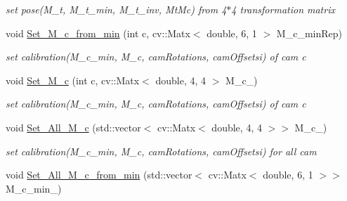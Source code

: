 \begin{DoxyCompactItemize}
\begin{DoxyCompactList}\small\item\em set pose(\+M\+\_\+t, M\+\_\+t\+\_\+min, M\+\_\+t\+\_\+inv, Mt\+Mc) from 4$\ast$4 transformation matrix \end{DoxyCompactList}\item 
void \hyperlink{classMultiColSLAM_1_1cMultiCamSys___a989b4a52f4e372d2620ced94fc675b02}{Set\+\_\+\+M\+\_\+c\+\_\+from\+\_\+min} (int c, cv\+::\+Matx$<$ double, 6, 1 $>$ M\+\_\+c\+\_\+min\+Rep)\hypertarget{classMultiColSLAM_1_1cMultiCamSys___a989b4a52f4e372d2620ced94fc675b02}{}\label{classMultiColSLAM_1_1cMultiCamSys___a989b4a52f4e372d2620ced94fc675b02}

\begin{DoxyCompactList}\small\item\em set calibration(\+M\+\_\+c\+\_\+min, M\+\_\+c, cam\+Rotations, cam\+Offsetsi) of cam c \end{DoxyCompactList}\item 
void \hyperlink{classMultiColSLAM_1_1cMultiCamSys___a39483546d528acc5acdbe500cbf9d23c}{Set\+\_\+\+M\+\_\+c} (int c, cv\+::\+Matx$<$ double, 4, 4 $>$ M\+\_\+c\+\_\+)\hypertarget{classMultiColSLAM_1_1cMultiCamSys___a39483546d528acc5acdbe500cbf9d23c}{}\label{classMultiColSLAM_1_1cMultiCamSys___a39483546d528acc5acdbe500cbf9d23c}

\begin{DoxyCompactList}\small\item\em set calibration(\+M\+\_\+c\+\_\+min, M\+\_\+c, cam\+Rotations, cam\+Offsetsi) of cam c \end{DoxyCompactList}\item 
void \hyperlink{classMultiColSLAM_1_1cMultiCamSys___a8aed2953b9921d66fb483286307f25a5}{Set\+\_\+\+All\+\_\+\+M\+\_\+c} (std\+::vector$<$ cv\+::\+Matx$<$ double, 4, 4 $>$$>$ M\+\_\+c\+\_\+)\hypertarget{classMultiColSLAM_1_1cMultiCamSys___a8aed2953b9921d66fb483286307f25a5}{}\label{classMultiColSLAM_1_1cMultiCamSys___a8aed2953b9921d66fb483286307f25a5}

\begin{DoxyCompactList}\small\item\em set calibration(\+M\+\_\+c\+\_\+min, M\+\_\+c, cam\+Rotations, cam\+Offsetsi) for all cam \end{DoxyCompactList}\item 
void \hyperlink{classMultiColSLAM_1_1cMultiCamSys___aa65265786747902d0dc2c631c12f54ca}{Set\+\_\+\+All\+\_\+\+M\+\_\+c\+\_\+from\+\_\+min} (std\+::vector$<$ cv\+::\+Matx$<$ double, 6, 1 $>$$>$ M\+\_\+c\+\_\+min\+\_\+)\hypertarget{classMultiColSLAM_1_1cMultiCamSys___aa65265786747902d0dc2c631c12f54ca}{}\label{classMultiColSLAM_1_1cMultiCamSys___aa65265786747902d0dc2c631c12f54ca}


\end{DoxyCompactItemize}

